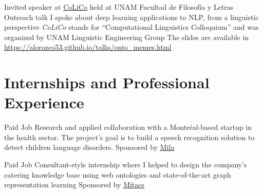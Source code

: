 \documentclass[8pt,a4paper,sans]{moderncv} %
\begin{document}
        {Invited speaker at \href{http://www.corpus.unam.mx/colico/VIIICoLiCo.html}{CoLiCo} held at UNAM Facultad de Filosofía y Letras}
        {Outreach talk}
        {I spoke about deep learning applications to NLP, from a linguistic perspective}
        {\emph{CoLiCo} stands for ``Computational Linguistics Colloquium'' and was organized by UNAM Linguistic Engineering Group}
        {The slides are available in \url{https://alorozco53.github.io/talks/onto_memes.html}}






\section{Internships and Professional Experience}

        {Paid Job}
        {Research and applied collaboration with a Montréal-based startup in the health sector.
         The project's goal is to build a speech recognition solution to detect children language disorders.}
        {Sponsored by \href{https://mila.quebec/en}{Mila}}
        {}

        {Paid Job}
        {Consultant-style internship where I helped to design the company's catering knowledge base using
         web ontologies and state-of-the-art graph representation learning}
        {Sponsored by \href{https://www.mitacs.ca/en}{Mitacs}}
        {}
\end{document}
